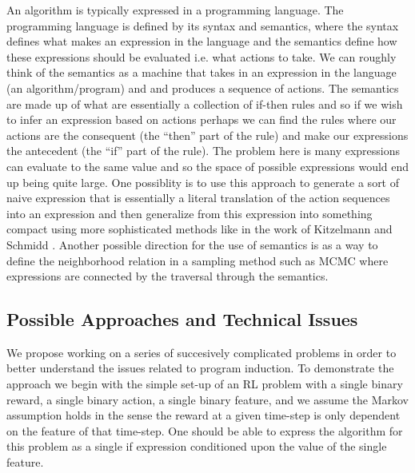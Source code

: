 \documentclass[a4paper,12pt]{article}
\begin{document}
An algorithm is typically expressed in a programming language.  The programming language is defined by its syntax and semantics, where the syntax defines what makes an expression in the language and the semantics define how these expressions should be evaluated i.e. what actions to take.  We can roughly think of the semantics as a machine that takes in an expression in the language (an algorithm/program) and and produces a sequence of actions.  The semantics are made up of what are essentially a collection of if-then rules and so if we wish to infer an expression based on actions perhaps we can find the rules where our actions are the consequent (the ``then'' part of the rule) and make our expressions the antecedent (the ``if'' part of the rule).  The problem here is many expressions can evaluate to the same value and so the space of possible expressions would end up being quite large.  One possiblity is to use this approach to generate a sort of naive expression that is essentially a literal translation of the action sequences into an expression and then generalize from this expression into something compact using more sophisticated methods like in the work of Kitzelmann and Schmidd \cite{Kitzelmann2006Inductive}.  Another possible direction for the use of semantics is as a way to define the neighborhood relation in a sampling method such as MCMC where expressions are connected by the traversal through the semantics.

\subsection{Possible Approaches and Technical Issues}
We propose working on a series of succesively complicated problems in order to better understand the issues related to program induction.  To demonstrate the approach we begin with the simple set-up of an RL problem with a single binary reward, a single binary action, a single binary feature, and we assume the Markov assumption holds in the sense the reward at a given time-step is only dependent on the feature of that time-step.  One should be able to express the algorithm for this problem as a single if expression conditioned upon the value of the single feature.
\end{document}
